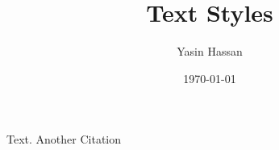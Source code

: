\documentclass{article}
\title{ Text Styles}
\author{Yasin Hassan}
\date{\today}
\begin{document}
\maketitle

Text\cite{mittelbach2004latex}. Another Citation\cite{Shelley}



\end{document}
